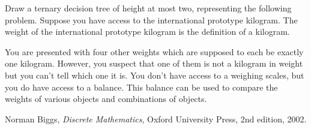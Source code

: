 

\begin{questions}

\question
Draw a ternary decision tree of height at most two, representing the following problem.
Suppose you have access to the international prototype kilogram.
The weight of the international prototype kilogram is the definition of a kilogram.

You are presented with four other weights which are supposed to each be exactly one kilogram.
However, you suspect that one of them is not a kilogram in weight but you can't tell which one it is.
You don't have access to a weighing scales, but you do have access to a balance.
This balance can be used to compare the weights of various objects and combinations of objects.
\begin{solution}
\end{solution}


\end{questions}

\begin{thebibliography}{9}

  Norman Biggs,
  \emph{Discrete Mathematics},
  Oxford University Press,
  2nd edition,
  2002.
\end{thebibliography}

